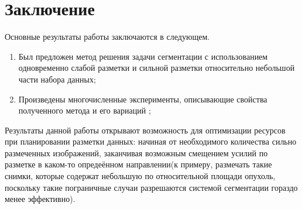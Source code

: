 \chapter*{Заключение}						%


\noindent Основные результаты работы заключаются в следующем.
%

\begin{enumerate}
    \item Был предложен метод решения задачи сегментации с использованием одновременно слабой разметки и сильной разметки относительно небольшой части набора данных;
    \item Произведены многочисленные эксперименты, описывающие свойства полученного метода и его вариаций ;
\end{enumerate}

Результаты данной работы открывают возможность для оптимизации ресурсов при планировании разметки данных: начиная от необходимого количества сильно размеченных изображений, заканчивая возможным смещением усилий по разметке в каком-то опредеённом направлении(к примеру, размечать такие снимки, которые содержат небольшую по относительной площади опухоль, поскольку такие пограничные случаи разрешаются системой сегментации гораздо менее эффективно). 

